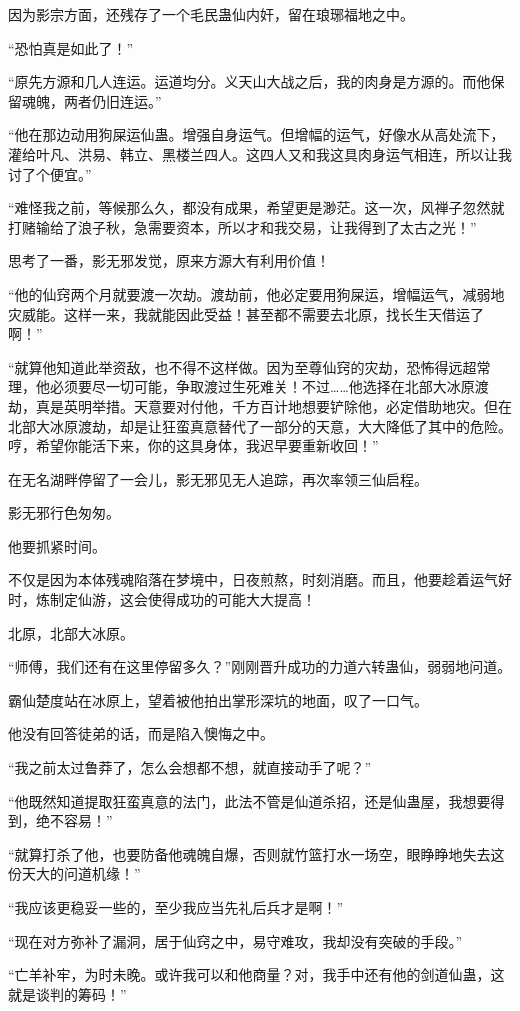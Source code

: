 \begin{this_body}
因为影宗方面，还残存了一个毛民蛊仙内奸，留在琅琊福地之中。

“恐怕真是如此了！”

“原先方源和几人连运。运道均分。义天山大战之后，我的肉身是方源的。而他保留魂魄，两者仍旧连运。”

“他在那边动用狗屎运仙蛊。增强自身运气。但增幅的运气，好像水从高处流下，灌给叶凡、洪易、韩立、黑楼兰四人。这四人又和我这具肉身运气相连，所以让我讨了个便宜。”

“难怪我之前，等候那么久，都没有成果，希望更是渺茫。这一次，风禅子忽然就打赌输给了浪子秋，急需要资本，所以才和我交易，让我得到了太古之光！”

思考了一番，影无邪发觉，原来方源大有利用价值！

“他的仙窍两个月就要渡一次劫。渡劫前，他必定要用狗屎运，增幅运气，减弱地灾威能。这样一来，我就能因此受益！甚至都不需要去北原，找长生天借运了啊！”

“就算他知道此举资敌，也不得不这样做。因为至尊仙窍的灾劫，恐怖得远超常理，他必须要尽一切可能，争取渡过生死难关！不过……他选择在北部大冰原渡劫，真是英明举措。天意要对付他，千方百计地想要铲除他，必定借助地灾。但在北部大冰原渡劫，却是让狂蛮真意替代了一部分的天意，大大降低了其中的危险。哼，希望你能活下来，你的这具身体，我迟早要重新收回！”

在无名湖畔停留了一会儿，影无邪见无人追踪，再次率领三仙启程。

影无邪行色匆匆。

他要抓紧时间。

不仅是因为本体残魂陷落在梦境中，日夜煎熬，时刻消磨。而且，他要趁着运气好时，炼制定仙游，这会使得成功的可能大大提高！

北原，北部大冰原。

“师傅，我们还有在这里停留多久？”刚刚晋升成功的力道六转蛊仙，弱弱地问道。

霸仙楚度站在冰原上，望着被他拍出掌形深坑的地面，叹了一口气。

他没有回答徒弟的话，而是陷入懊悔之中。

“我之前太过鲁莽了，怎么会想都不想，就直接动手了呢？”

“他既然知道提取狂蛮真意的法门，此法不管是仙道杀招，还是仙蛊屋，我想要得到，绝不容易！”

“就算打杀了他，也要防备他魂魄自爆，否则就竹篮打水一场空，眼睁睁地失去这份天大的问道机缘！”

“我应该更稳妥一些的，至少我应当先礼后兵才是啊！”

“现在对方弥补了漏洞，居于仙窍之中，易守难攻，我却没有突破的手段。”

“亡羊补牢，为时未晚。或许我可以和他商量？对，我手中还有他的剑道仙蛊，这就是谈判的筹码！”

\end{this_body}

